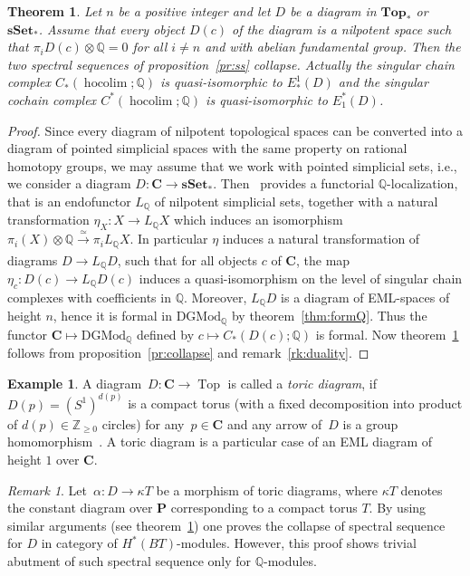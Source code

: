 \documentclass{amsart}
\newtheorem{theorem}[formula]{Theorem}
\theoremstyle{definition}
\newtheorem{example}[formula]{Example}
\theoremstyle{remark}
\newtheorem{remark}[formula]{Remark}
\newcommand{\Z}{\mathbb Z}
\newcommand{\Q}{\mathbb Q}
\DeclareMathOperator{\hoc}{hocolim}
\DeclareMathOperator{\Top}{Top}
\renewcommand{\geq}{\geqslant}
\newcommand{\Cc}{\mathbf{C}}
\newcommand{\Pp}{\mathbf{P}}
\newcommand{\sset}{\mathbf{sSet}}
\renewcommand{\top}{\mathbf{Top}}
\begin{document}
\begin{theorem}\label{thm:rcollf}
	Let $n$ be a positive integer and let $D$ be a diagram in $\top_*$ or $\sset_*$. Assume that every object $D(c)$ of the diagram is a nilpotent space such that $\pi_iD(c)\otimes\Q =0$ for all $i\ne n$ and with abelian fundamental group.
	Then the two spectral sequences of proposition~\ref{pr:ss} collapse. 
	Actually the singular chain complex $C_*(\hoc;\Q)$ is quasi-isomorphic to $E^1_*(D)$ and the singular cochain complex $C^*(\hoc;\Q)$ is quasi-isomorphic to $E_1^*(D)$.
\end{theorem}
\begin{proof}
	Since every diagram of nilpotent topological spaces can be converted into a diagram of pointed simplicial spaces with the same property on rational homotopy groups, we may assume that we work with pointed simplicial sets, i.e., we consider a diagram $D:\Cc\to \sset_*$. 
	Then~\cite[V 4.2]{bo-ka-72} provides a functorial $\Q$-localization, that is an endofunctor $L_\Q$ of nilpotent simplicial sets, together with a natural transformation $\eta_X:X\to L_\Q X$ which induces 
	an isomorphism $\pi_i(X)\otimes\Q \xrightarrow[]{\simeq}\pi_iL_\Q X$. In particular $\eta$ induces a natural transformation of diagrams $D\to L_\Q D$, such that for all objects $c$ of $\Cc$, the map $\eta_c:D(c)\to L_\Q D(c)$ induces a quasi-isomorphism on the level of singular chain complexes with coefficients in $\Q$. Moreover, $L_\Q D$ is a diagram of EML-spaces of height $n$, hence it is formal in $\mathrm{DGMod}_\Q$ by theorem~\ref{thm:formQ}. Thus the functor $\Cc\mapsto \mathrm{DGMod}_\Q$ defined by $c\mapsto C_*(D(c);\Q)$ is formal. 
	Now theorem~\ref{thm:rcollf} follows from proposition~\ref{pr:collapse} and remark~\ref{rk:duality}. 
\end{proof}

\begin{example}
	A diagram~$D\colon\Cc\to \Top$ is called a \emph{toric diagram}, if~$D(p)=(S^{1})^{d(p)}$ is a compact torus (with a fixed decomposition into product of $d(p)\in \Z_{\geq 0}$ circles) for any~$p\in \Cc$ and any arrow of~$D$ is a group homomorphism~\cite{we-zi-zi-99}.
	A toric diagram is a particular case of an EML diagram of height $1$ over $\Cc$.
\end{example}

\begin{remark}
	Let~$\alpha\colon D\to \kappa T$ be a morphism of toric diagrams, where $\kappa T$ denotes the constant diagram over $\Pp$ corresponding to a compact torus $T$.
	By using similar arguments (see theorem~\ref{thm:rcollf}) one proves the collapse of spectral sequence for $D$ in category of $H^*(BT)$-modules.
	However, this proof shows trivial abutment of such spectral sequence only for $\Q$-modules.
\end{remark}
\end{document}
